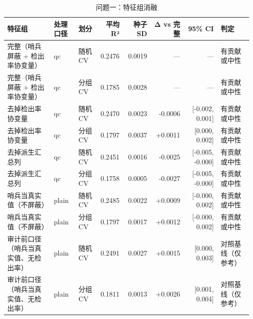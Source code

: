 \begin{table}[tbp]
\centering
\caption{问题一：特征组消融}
\label{tab:t04_q1_ablation}
\footnotesize
\setlength{\tabcolsep}{3.5pt}
\begin{tabular}{lllrrrrl}
\toprule
特征组 & 处理口径 & 划分 & 平均 R² & 种子 SD & Δ vs 完整 & 95\% CI & 判定 \\
\midrule
完整（哨兵屏蔽 + 检出率协变量） & qc & 随机 CV & 0.2476 & 0.0019 & — & — & 有贡献或中性 \\
完整（哨兵屏蔽 + 检出率协变量） & qc & 分组 CV & 0.1785 & 0.0028 & — & — & 有贡献或中性 \\
去掉检出率协变量 & qc & 随机 CV & 0.2470 & 0.0023 & -0.0006 & [-0.002, 0.001] & 有贡献或中性 \\
去掉检出率协变量 & qc & 分组 CV & 0.1797 & 0.0037 & +0.0011 & [0.000, 0.002] & 有贡献或中性 \\
去掉派生汇总列 & qc & 随机 CV & 0.2451 & 0.0016 & -0.0025 & [-0.005, -0.000] & 有贡献或中性 \\
去掉派生汇总列 & qc & 分组 CV & 0.1758 & 0.0005 & -0.0027 & [-0.005, -0.000] & 有贡献或中性 \\
哨兵当真实值（不屏蔽） & plain & 随机 CV & 0.2485 & 0.0022 & +0.0009 & [-0.000, 0.002] & 有贡献或中性 \\
哨兵当真实值（不屏蔽） & plain & 分组 CV & 0.1797 & 0.0017 & +0.0012 & [-0.000, 0.002] & 有贡献或中性 \\
审计前口径（哨兵当真实值、无检出率） & plain & 随机 CV & 0.2491 & 0.0027 & +0.0015 & [0.000, 0.003] & 对照基线（仅参考） \\
审计前口径（哨兵当真实值、无检出率） & plain & 分组 CV & 0.1811 & 0.0013 & +0.0026 & [0.001, 0.004] & 对照基线（仅参考） \\
\bottomrule
\end{tabular}
\end{table}
